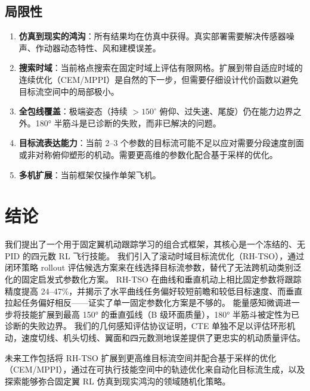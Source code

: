 \documentclass{article}
\begin{document}
\subsection{局限性}

\begin{enumerate}
  \item \textbf{仿真到现实的鸿沟}：所有结果均在仿真中获得。真实部署需要解决传感器噪声、作动器动态特性、风和建模误差。
  \item \textbf{搜索时域}：当前格点搜索在固定时域上评估有限网格。扩展到带自适应时域的连续优化（CEM/MPPI）是自然的下一步，但需要仔细设计代价函数以避免目标流空间中的局部极小。
  \item \textbf{全包线覆盖}：极端姿态（持续 $>150^\circ$ 俯仰、过失速、尾旋）仍在能力边界之外。180° 半筋斗是已诊断的失败，而非已解决的问题。
  \item \textbf{目标流表达能力}：当前 2--3 个参数的目标流可能不足以应对需要分段速度剖面或非对称俯仰塑形的机动。需要更高维的参数化配合基于采样的优化。
  \item \textbf{多机扩展}：当前框架仅操作单架飞机。
\end{enumerate}


\section{结论}

我们提出了一个用于固定翼机动跟踪学习的组合式框架，其核心是一个冻结的、无 PID 的四元数 RL 飞行技能。
我们引入了滚动时域目标流优化（RH-TSO），通过闭环策略 rollout 评估候选方案来在线选择目标流参数，替代了无法跨机动类别泛化的固定启发式参数化方案。
RH-TSO 在曲线和垂直机动上相比固定参数将跟踪精度提高 24--47\%，并揭示了水平曲线任务偏好较短前瞻和较低目标速度、而垂直拉起任务偏好相反——证实了单一固定参数化方案是不够的。
能量感知微调进一步将技能扩展到最高 150° 的垂直弧线（B 级环面质量），180° 半筋斗被定性为已诊断的失败边界。
我们的几何感知评估协议证明，CTE 单独不足以评估环形机动，速度切线、机头切线、翼面和四元数测地误差提供了更忠实的机动质量评估。

未来工作包括将 RH-TSO 扩展到更高维目标流空间并配合基于采样的优化（CEM/MPPI），通过在可执行技能空间中的轨迹优化来自动化目标流生成，以及探索能够弥合固定翼 RL 仿真到现实鸿沟的领域随机化策略。


\clearpage
{}



\end{document}
